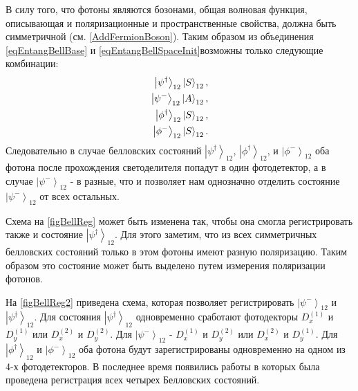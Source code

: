 В силу того, что фотоны являются бозонами, 
общая волновая функция,
описывающая и поляризационные и пространственные свойства,
должна быть симметричной \cite{bFeinman}
(см. \autoref{AddFermionBoson}). Таким образом из объединения 
\eqref{eqEntangBellBase} и \eqref{eqEntangBellSpaceInit}возможны
только следующие комбинации:
\begin{eqnarray}
\left|\psi^{\dag}\right>_{12}\ket{S}_{12},
\nonumber \\ 
\left|\psi^{-}\right>_{12}\ket{A}_{12}, 
\nonumber \\ 
\left|\phi^{\dag}\right>_{12}\ket{S}_{12}, 
\nonumber \\ 
\left|\phi^{-}\right>_{12}\ket{S}_{12}.
\nonumber
\end{eqnarray}
Следовательно в случае белловских состояний 
$\left|\psi^{\dag}\right>_{12}$, $\left|\phi^{\dag}\right>_{12}$, и
$\left|\phi^{-}\right>_{12}$ оба фотона после прохождения
светоделителя попадут в один фотодетектор, а в случае
$\left|\psi^{-}\right>_{12}$ - в разные, что и позволяет нам
однозначно отделить состояние $\left|\psi^{-}\right>_{12}$ от всех
остальных. 



Схема на \autoref{figBellReg} может быть изменена так, чтобы она
смогла регистрировать также и состояние
$\left|\psi^{\dag}\right>_{12}$. Для этого заметим, что из всех
симметричных белловских состояний только в этом фотоны имеют разную
поляризацию. Таким образом это состояние может быть выделено путем
измерения поляризации фотонов.

На \autoref{figBellReg2} приведена схема, которая позволяет
регистрировать $\left|\psi^{-}\right>_{12}$ и
$\left|\psi^{\dag}\right>_{12}$. Для состояния
$\left|\psi^{\dag}\right>_{12}$ одновременно сработают фотодекторы 
$D^{(1)}_x$ и $D^{(1)}_y$ или $D^{(2)}_x$ и $D^{(2)}_y$. Для
$\left|\psi^{-}\right>_{12}$ - $D^{(1)}_x$ и $D^{(2)}_y$ или
$D^{(2)}_x$ и $D^{(1)}_y$. Для $\left|\phi^{\dag}\right>_{12}$ и
$\left|\phi^{-}\right>_{12}$ оба фотона будут зарегистрированы
одновременно на одном из 4-х фотодетекторов. В последнее время
появились работы \cite{bKulik} в которых была проведена регистрация
всех четырех Белловских состояний.
